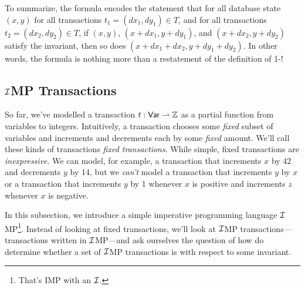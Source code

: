 To summarize, the formula encodes the statement that for all database state
$(x, y)$ for all transactions $t_1 = (dx_1, dy_1) \in T$, and for all
transactions $t_2 = (dx_2, dy_2) \in T$, if $(x, y)$, $(x + dx_1, y + dy_1)$,
and $(x + dx_2, y + dy_2)$ satisfy the invariant, then so does $(x + dx_1 +
dx_2, y + dy_1 + dy_2)$. In other words, the formula is nothing more than a
restatement of the definition of 1-\iconfluence!

\newcommand{\imp}{$\iinvariant$MP}
\subsection{\imp{} Transactions}\label{sec:imptxns}
So far, we've modelled a transaction $t: \textsf{Var} \rightharpoonup \mathbb{Z}$ as a
partial function from variables to integers. Intuitively, a transaction chooses
some \emph{fixed} subset of variables and increments and decrements each by
some \emph{fixed} amount. We'll call these kinds of transactions \emph{fixed
transactions}. While simple, fixed transactions are \emph{inexpressive}. We can
model, for example, a transaction that increments $x$ by 42 and decrements $y$
by 14, but we \emph{can't} model a transaction that increments $y$ by $x$ or a
transaction that increments $y$ by 1 whenever $x$ is positive and increments
$z$ whenever $x$ is negative.

In this subsection, we introduce a simple imperative programming language
\imp{}\footnote{That's IMP \cite{winskel1993formal} with an $\mathcal{I}{}$.}.
Instead of looking at fixed transactions, we'll look at \imp{}
transactions---transactions written in \imp{}---and ask ourselves the question
of how do determine whether a set of \imp{} transactions is \iconfluent{} with
respect to some invariant.

